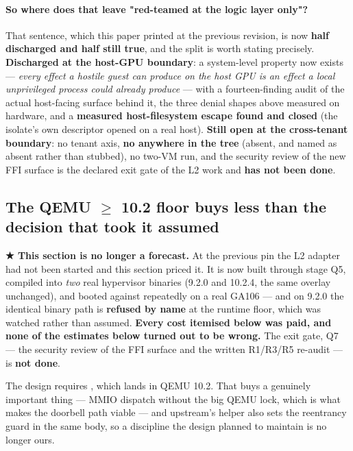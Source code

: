 \documentclass[10.5pt]{article}
\begin{document}
\paragraph{So where does that leave "red-teamed at the logic layer only"?} That sentence, which
this paper printed at the previous revision, is now \textbf{half discharged and half still true},
and the split is worth stating precisely. \textbf{Discharged at the host-GPU boundary}: a
system-level property now exists — \emph{every effect a hostile guest can produce on the host GPU
is an effect a local unprivileged process could already produce} — with a fourteen-finding audit
of the actual host-facing surface behind it, the three denial shapes above measured on hardware,
and a \textbf{measured host-filesystem escape found and closed} (the isolate's own 
descriptor opened  on a real host). \textbf{Still open at the cross-tenant
boundary}: no tenant axis, \textbf{no  anywhere in the tree} (absent, and named as
absent rather than stubbed), no two-VM run, and the security review of the new FFI surface is the
declared exit gate of the L2 work and \textbf{has not been done}.

\subsection{The QEMU $\geq$ 10.2 floor buys less than the decision that took it assumed}
\label{sec:qemu}

\begin{claimbox}\small
\textbf{★ This section is no longer a forecast.} At the previous pin the L2 adapter had not been
started and this section priced it. It is now built through stage Q5, compiled into \emph{two}
real hypervisor binaries (9.2.0 and 10.2.4, the same overlay unchanged), and booted against
repeatedly on a real GA106 — and on 9.2.0 the identical binary path is \textbf{refused by name}
at the runtime floor, which was watched rather than assumed. \textbf{Every cost itemised below
was paid, and none of the estimates below turned out to be wrong.} The exit gate, Q7 — the
security review of the FFI surface and the written R1/R3/R5 re-audit — is \textbf{not done}.
\end{claimbox}

The design requires , which lands in QEMU 10.2. That
buys a genuinely important thing — MMIO dispatch without the big QEMU lock, which is what makes
the doorbell path viable — and upstream's helper also sets the reentrancy guard in the same body,
so a discipline the design planned to maintain is no longer ours.
\end{document}
